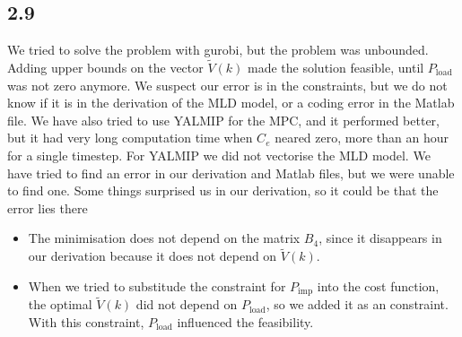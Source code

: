 \subsection*{2.9}
We tried to solve the problem with gurobi, but the problem was unbounded. Adding upper bounds on the vector $\tilde{V}(k)$ made the solution feasible, until $P_{\text{load}}$ was not zero anymore. We suspect our error is in the constraints, but we do not know if it is in the derivation of the MLD model, or a coding error in the Matlab file. We have also tried to use YALMIP for the MPC, and it performed better, but it had very long computation time when $C_e$ neared zero, more than an hour for a single timestep. For YALMIP we did not vectorise the MLD model.
We have tried to find an error in our derivation and Matlab files, but we were unable to find one. Some things surprised us in our derivation, so it could be that the error lies there
\begin{itemize}
    \item The minimisation does not depend on the matrix $B_4$, since it disappears in our derivation because it does not depend on $\tilde{V}(k)$.
    \item When we tried to substitude the constraint for $P_{\text{imp}}$ into the cost function, the optimal $\tilde{V}(k)$ did not depend on $P_{\text{load}}$, so we added it as an constraint. With this constraint, $P_{\text{load}}$ influenced the feasibility.
\end{itemize}
